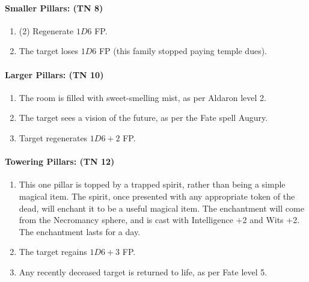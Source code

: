 \begin{multicols}{2}
\paragraph{Smaller Pillars: (TN 8)}

\begin{enumerate}

	\item{(2) Regenerate $1D6$ FP.}
	\item{The target loses $1D6$ FP (this family stopped paying temple dues).}
\end{enumerate}

\paragraph{Larger Pillars: (TN 10)}

\begin{enumerate}

	\item{The room is filled with sweet-smelling mist, as per Aldaron level 2.}
	\item{The target sees a vision of the future, as per the Fate spell Augury.}
	\item{Target regenerates $1D6+2$ FP.}
\end{enumerate}

\paragraph{Towering Pillars: (TN 12)}

\begin{enumerate}

	\item{This one pillar is topped by a trapped spirit, rather than being a simple magical item.  The spirit, once presented with any appropriate token of the dead, will enchant it to be a useful magical item.  The enchantment will come from the Necromancy sphere, and is cast with Intelligence +2 and Wits +2.  The enchantment lasts for a day.}
	\item{The target regains $1D6+3$ FP.}
	\item{Any recently deceased target is returned to life, as per Fate level 5.}

\end{enumerate}

\vfill\null

\end{multicols}

